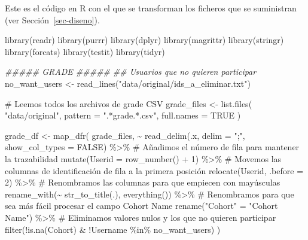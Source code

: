 \documentclass[
  12pt,
  a4paper,
  extrafontsizes,
  onecolumn,
  openright]{memoir}
\newenvironment{Shaded}{\begin{snugshade}}{\end{snugshade}}
\newcommand{\AttributeTok}[1]{\textcolor[rgb]{0.40,0.45,0.13}{#1}}
\newcommand{\CommentTok}[1]{\textcolor[rgb]{0.37,0.37,0.37}{#1}}
\newcommand{\ConstantTok}[1]{\textcolor[rgb]{0.56,0.35,0.01}{#1}}
\newcommand{\DecValTok}[1]{\textcolor[rgb]{0.68,0.00,0.00}{#1}}
\newcommand{\DocumentationTok}[1]{\textcolor[rgb]{0.37,0.37,0.37}{\textit{#1}}}
\newcommand{\FunctionTok}[1]{\textcolor[rgb]{0.28,0.35,0.67}{#1}}
\newcommand{\NormalTok}[1]{\textcolor[rgb]{0.00,0.23,0.31}{#1}}
\newcommand{\OtherTok}[1]{\textcolor[rgb]{0.00,0.23,0.31}{#1}}
\newcommand{\SpecialCharTok}[1]{\textcolor[rgb]{0.37,0.37,0.37}{#1}}
\newcommand{\StringTok}[1]{\textcolor[rgb]{0.13,0.47,0.30}{#1}}
\begin{document}
Este es el código en R con el que se transforman los ficheros que se
suministran (ver Sección~\ref{sec-diseno}).

\footnotesize

\begin{Shaded}
\begin{Highlighting}[]
\FunctionTok{library}\NormalTok{(readr)}
\FunctionTok{library}\NormalTok{(purrr)}
\FunctionTok{library}\NormalTok{(dplyr)}
\FunctionTok{library}\NormalTok{(magrittr)}
\FunctionTok{library}\NormalTok{(stringr)}
\FunctionTok{library}\NormalTok{(forcats)}
\FunctionTok{library}\NormalTok{(testit)}
\FunctionTok{library}\NormalTok{(tidyr)}

\DocumentationTok{\#\#\#\#\# GRADE \#\#\#\#\#}
\DocumentationTok{\#\# Usuarios que no quieren participar}
\NormalTok{no\_want\_users }\OtherTok{\textless{}{-}} \FunctionTok{read\_lines}\NormalTok{(}\StringTok{"data/original/ids\_a\_eliminar.txt"}\NormalTok{)}

\CommentTok{\# Leemos todos los archivos de grade CSV}
\NormalTok{grade\_files }\OtherTok{\textless{}{-}} \FunctionTok{list.files}\NormalTok{(}
    \StringTok{"data/original"}\NormalTok{, }\AttributeTok{pattern =} \StringTok{".*grade.*.csv"}\NormalTok{, }\AttributeTok{full.names =} \ConstantTok{TRUE}
\NormalTok{)}

\NormalTok{grade\_df }\OtherTok{\textless{}{-}} \FunctionTok{map\_dfr}\NormalTok{(}
\NormalTok{    grade\_files, }\SpecialCharTok{\textasciitilde{}} \FunctionTok{read\_delim}\NormalTok{(.x, }\AttributeTok{delim =} \StringTok{";"}\NormalTok{, }\AttributeTok{show\_col\_types =} \ConstantTok{FALSE}\NormalTok{) }\SpecialCharTok{\%\textgreater{}\%}
        \CommentTok{\# Añadimos el número de fila para mantener la trazabilidad}
        \FunctionTok{mutate}\NormalTok{(}\AttributeTok{Userid =} \FunctionTok{row\_number}\NormalTok{() }\SpecialCharTok{+} \DecValTok{1}\NormalTok{) }\SpecialCharTok{\%\textgreater{}\%} 
        \CommentTok{\# Movemos las columnas de identificación de fila a la primera posición}
        \FunctionTok{relocate}\NormalTok{(Userid, }\AttributeTok{.before =} \DecValTok{2}\NormalTok{) }\SpecialCharTok{\%\textgreater{}\%}
        \CommentTok{\# Renombramos las columnas para que empiecen con mayúsculas}
        \FunctionTok{rename\_with}\NormalTok{(}\SpecialCharTok{\textasciitilde{}} \FunctionTok{str\_to\_title}\NormalTok{(.), }\FunctionTok{everything}\NormalTok{()) }\SpecialCharTok{\%\textgreater{}\%} 
        \CommentTok{\# Renombramos para que sea más fácil procesar el campo Cohort Name}
        \FunctionTok{rename}\NormalTok{(}\StringTok{"Cohort"} \OtherTok{=} \StringTok{"Cohort Name"}\NormalTok{) }\SpecialCharTok{\%\textgreater{}\%}
        \CommentTok{\# Eliminamos valores nulos y los que no quieren participar}
        \FunctionTok{filter}\NormalTok{(}\SpecialCharTok{!}\FunctionTok{is.na}\NormalTok{(Cohort) }\SpecialCharTok{\&} \SpecialCharTok{!}\NormalTok{Username }\SpecialCharTok{\%in\%}\NormalTok{ no\_want\_users) }
\NormalTok{)}


\end{Highlighting}
\end{Shaded}
\end{document}
